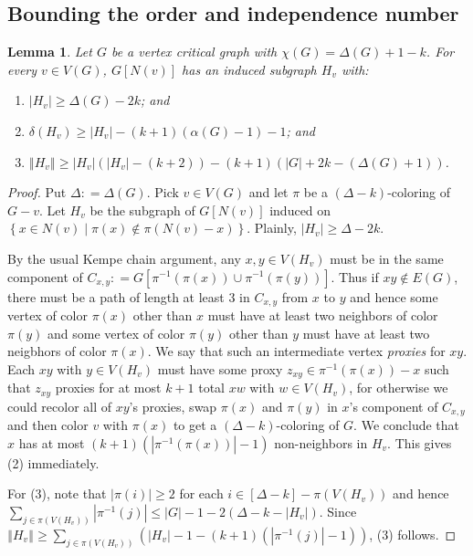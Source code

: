 \documentclass[12pt]{article}
\theoremstyle{plain}
\newtheorem{lem}[thm]{Lemma}
\theoremstyle{definition}
\theoremstyle{remark}
\newcommand{\setb}[3]{\left\{ #1 \in #2 \mid #3 \right\}}
\newcommand{\card}[1]{\left|#1\right|}
\newcommand{\size}[1]{\left\Vert#1\right\Vert}
\newcommand{\irange}[1]{\left[#1\right]}
\newcommand{\parens}[1]{\left( #1 \right)}
\newcommand{\DefinedAs}{\mathrel{\mathop:}=}
\begin{document}
\subsection{Bounding the order and independence number}
\begin{lem}\label{Onesies}
Let $G$ be a vertex critical graph with $\chi(G) = \Delta(G) + 1 - k$.  For every $v \in V(G)$, $G[N(v)]$ has an induced subgraph $H_v$ with:
\begin{enumerate}
\item $\card{H_v} \geq \Delta(G) - 2k$; and
\item $\delta(H_v) \geq \card{H_v} - (k+1)(\alpha(G) - 1) - 1$; and
\item $\size{H_v} \geq \card{H_v}\parens{\card{H_v}- (k+2)} - (k+1)\parens{\card{G} + 2k - (\Delta(G) + 1)}$.
\end{enumerate}
\end{lem}
\begin{proof}
Put $\Delta \DefinedAs \Delta(G)$. Pick $v \in V(G)$ and let $\pi$ be a $(\Delta - k)$-coloring of $G-v$.  Let $H_v$ be the subgraph of $G[N(v)]$ induced on $\setb{x}{N(v)}{\pi(x) \not \in \pi(N(v) - x)}$.  Plainly, $\card{H_v} \geq \Delta - 2k$.

By the usual Kempe chain argument, any $x, y \in V(H_v)$ must be in the same component of $C_{x,y} \DefinedAs G[\pi^{-1}(\pi(x)) \cup \pi^{-1}(\pi(y))]$.  Thus if $xy \not \in E(G)$, there must be a path of length at least $3$ in $C_{x,y}$ from $x$ to $y$ and hence some vertex of color $\pi(x)$ other than $x$ must have at least two neighbors of color $\pi(y)$ and some vertex of color $\pi(y)$ other than $y$ must have at least two neigbhors of color $\pi(x)$.  We say that such an intermediate vertex \emph{proxies} for $xy$.  Each $xy$ with $y \in V(H_v)$ must have some proxy $z_{xy} \in \pi^{-1}(\pi(x)) - x$ such that $z_{xy}$ proxies for at most $k+1$ total $xw$ with $w \in V(H_v)$, for otherwise we could recolor all of $xy$'s proxies, swap $\pi(x)$ and $\pi(y)$ in $x$'s component of $C_{x,y}$ and then color $v$ with $\pi(x)$ to get a $(\Delta-k)$-coloring of $G$.  We conclude that $x$ has at most $(k+1)(\card{\pi^{-1}(\pi(x))} - 1)$ non-neighbors in $H_v$.  This gives (2) immediately.

For (3), note that $\card{\pi(i)} \geq 2$ for each $i \in \irange{\Delta-k} - \pi(V(H_v))$ and hence $\sum_{j \in \pi(V(H_v))} \card{\pi^{-1}(j)} \leq \card{G} - 1 - 2(\Delta - k - \card{H_v})$.  Since $\size{H_v} \geq \sum_{j  \in \pi(V(H_v))} \parens{\card{H_v} - 1 - (k+1)(\card{\pi^{-1}(j)} - 1)}$, (3) follows.
\end{proof}
\end{document}

